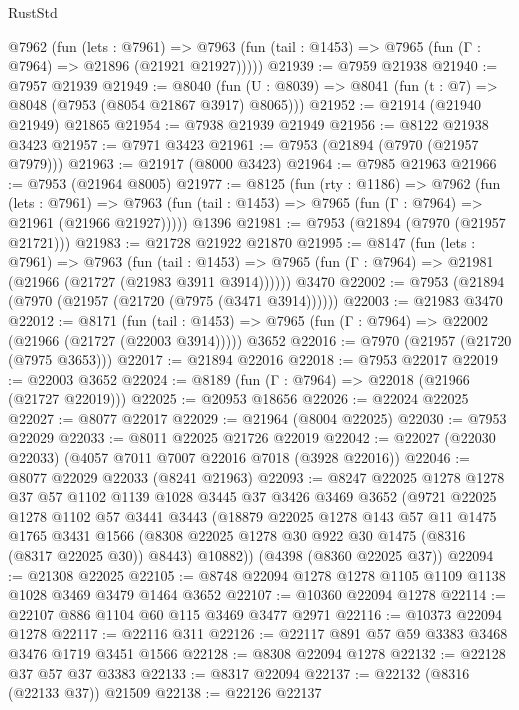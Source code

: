 \begin{lexlean}{RustStd}
\begin{coremodule}
    @7962
      (fun (lets : @7961) =>
      @7963 (fun (tail : @1453) => @7965 (fun (Γ : @7964) => @21896 (@21921 @21927)))))
@21939 := @7959 @21938
@21940 := @7957 @21939
@21949 := @8040
    (fun (U : @8039) => @8041 (fun (t : @7) => @8048 (@7953 (@8054 @21867 @3917) @8065)))
@21952 := @21914 (@21940 @21949) @21865
@21954 := @7938 @21939 @21949
@21956 := @8122 @21938 @3423
@21957 := @7971 @3423
@21961 := @7953 (@21894 (@7970 (@21957 @7979)))
@21963 := @21917 (@8000 @3423)
@21964 := @7985 @21963
@21966 := @7953 (@21964 @8005)
@21977 := @8125
    (fun (rty : @1186) =>
    @7962
      (fun (lets : @7961) =>
      @7963 (fun (tail : @1453) => @7965 (fun (Γ : @7964) => @21961 (@21966 @21927)))))
    @1396
@21981 := @7953 (@21894 (@7970 (@21957 @21721)))
@21983 := @21728 @21922 @21870
@21995 := @8147
    (fun (lets : @7961) =>
    @7963
      (fun (tail : @1453) =>
      @7965 (fun (Γ : @7964) => @21981 (@21966 (@21727 (@21983 @3911 @3914))))))
    @3470
@22002 := @7953 (@21894 (@7970 (@21957 (@21720 (@7975 (@3471 @3914))))))
@22003 := @21983 @3470
@22012 := @8171
    (fun (tail : @1453) => @7965 (fun (Γ : @7964) => @22002 (@21966 (@21727 (@22003 @3914)))))
    @3652
@22016 := @7970 (@21957 (@21720 (@7975 @3653)))
@22017 := @21894 @22016
@22018 := @7953 @22017
@22019 := @22003 @3652
@22024 := @8189 (fun (Γ : @7964) => @22018 (@21966 (@21727 @22019)))
@22025 := @20953 @18656
@22026 := @22024 @22025
@22027 := @8077 @22017
@22029 := @21964 (@8004 @22025)
@22030 := @7953 @22029
@22033 := @8011 @22025 @21726 @22019
@22042 := @22027 (@22030 @22033) (@4057 @7011 @7007 @22016 @7018 (@3928 @22016))
@22046 := @8077 @22029 @22033 (@8241 @21963)
@22093 := @8247
    @22025
    @1278
    @1278
    @37
    @57
    @1102
    @1139
    @1028
    @3445
    @37
    @3426
    @3469
    @3652
    (@9721
      @22025
      @1278
      @1102
      @57
      @3441
      @3443
      (@18879
        @22025
        @1278
        @143
        @57
        @11
        @1475
        @1765
        @3431
        @1566
        (@8308 @22025 @1278 @30 @922 @30 @1475 (@8316 (@8317 @22025 @30)) @8443)
        @10882))
    (@4398 (@8360 @22025 @37))
@22094 := @21308 @22025
@22105 := @8748 @22094 @1278 @1278 @1105 @1109 @1138 @1028 @3469 @3479 @1464 @3652
@22107 := @10360 @22094 @1278
@22114 := @22107 @886 @1104 @60 @115 @3469 @3477 @2971
@22116 := @10373 @22094 @1278
@22117 := @22116 @311
@22126 := @22117 @891 @57 @59 @3383 @3468 @3476 @1719 @3451 @1566
@22128 := @8308 @22094 @1278
@22132 := @22128 @37 @57 @37 @3383
@22133 := @8317 @22094
@22137 := @22132 (@8316 (@22133 @37)) @21509
@22138 := @22126 @22137

\end{coremodule}
\end{lexlean}
